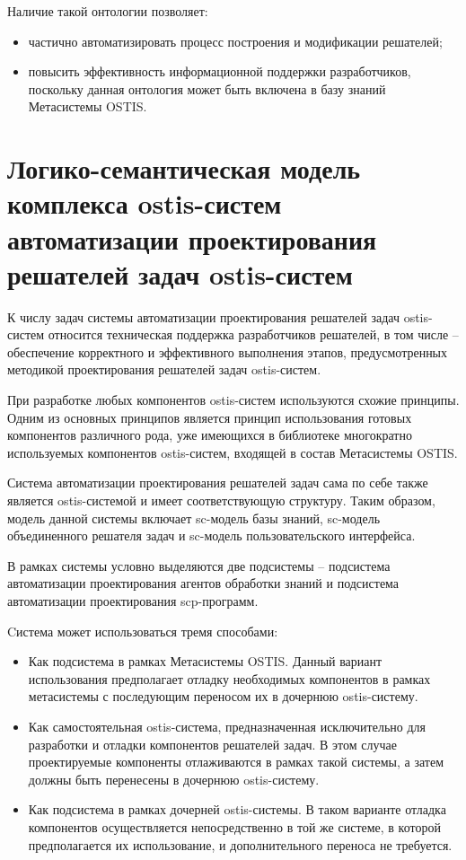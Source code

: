 Наличие такой онтологии позволяет:
\begin{itemize}
    \item частично автоматизировать процесс построения и модификации решателей;
    \item повысить эффективность информационной поддержки разработчиков, поскольку данная онтология может быть включена в базу знаний Метасистемы OSTIS.
\end{itemize}

\section{Логико-семантическая модель комплекса ostis-систем автоматизации проектирования решателей задач ostis-систем}

К числу задач системы автоматизации проектирования решателей задач ostis-систем относится техническая поддержка разработчиков решателей, в том числе -- обеспечение корректного и эффективного выполнения этапов, предусмотренных методикой проектирования решателей задач ostis-систем.

При разработке любых компонентов ostis-систем используются схожие принципы. Одним из основных принципов является принцип использования готовых компонентов различного рода, уже имеющихся в библиотеке многократно используемых компонентов ostis-систем, входящей в состав Метасистемы OSTIS.

Система автоматизации проектирования решателей задач сама по себе также является ostis-системой и имеет соответствующую структуру. Таким образом, модель данной системы включает sc-модель базы знаний, sc-модель объединенного решателя задач и sc-модель пользовательского интерфейса.

В рамках системы условно выделяются две подсистемы -- подсистема автоматизации проектирования агентов обработки знаний и подсистема автоматизации проектирования scp-программ.

Cистема может использоваться тремя способами:
\begin{itemize}
    \item Как подсистема в рамках Метасистемы OSTIS. Данный вариант использования предполагает отладку необходимых компонентов в рамках метасистемы с последующим переносом их в дочернюю ostis-систему.
    \item Как самостоятельная ostis-система, предназначенная исключительно для разработки и отладки компонентов решателей задач. В этом случае проектируемые компоненты отлаживаются в рамках такой системы, а затем должны быть перенесены в дочернюю ostis-систему.
    \item Как подсистема в рамках дочерней ostis-системы. В таком варианте отладка компонентов осуществляется непосредственно в той же системе, в которой предполагается их использование, и дополнительного переноса не требуется.
\end{itemize}

